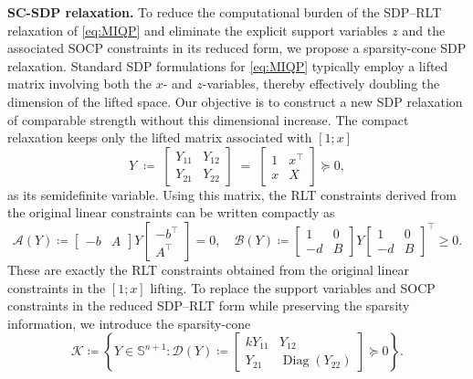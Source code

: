 \documentclass[11pt]{article}
\DeclareMathOperator{\Diag}{Diag}
\def\D{\mathcal{D}}
\def\A{\mathcal{A}}
\def\B{\mathcal{B}}
\def\K{\mathcal{K}}
\def\S{\mathbb{S}}
\def\tb#1{\textbf{#1}}
\theoremstyle{plain}
\begin{document}
\medskip

\noindent\tb{SC-SDP relaxation.} 
{To reduce the computational burden of the SDP--RLT relaxation of \eqref{eq:MIQP} and eliminate the explicit support variables $z$ and the associated SOCP constraints in its reduced form,} we propose a sparsity-cone SDP relaxation. Standard SDP formulations for \eqref{eq:MIQP} typically employ a lifted matrix involving both the $x$- and $z$-variables, thereby effectively doubling the dimension of the lifted space. Our objective is to construct a new SDP relaxation of comparable strength without this dimensional increase. The compact relaxation keeps only the lifted matrix associated with $[1;x]$
\begin{equation}\label{eq:intro-Y}
    Y
\;\coloneq\; 
\begin{bmatrix}
    Y_{11} &Y_{12}\\Y_{21} & Y_{22}
\end{bmatrix}
\;=\;
\begin{bmatrix}
    1&x^\top \\
    x&X
\end{bmatrix}\succeq 0,
\end{equation}
as its semidefinite variable. Using this matrix, the RLT constraints derived from the original linear constraints can be written compactly as
\begin{equation}\label{eq:intro-RLT}
    \A(Y)\coloneqq\begin{bmatrix}
    -b&A
    \end{bmatrix}
    Y\begin{bmatrix}
        -b^\top\\A^\top
    \end{bmatrix}=0,\quad
    \B(Y)\coloneqq  \begin{bmatrix}
     1&0
        \\-d&B
    \end{bmatrix}
    Y\begin{bmatrix}
        1&0
        \\-d&B
    \end{bmatrix}^\top\geq 0.
\end{equation}
These are exactly the RLT constraints obtained from the original linear constraints in the $[1;x]$ lifting. {To replace the support variables and SOCP constraints in the reduced SDP--RLT form while preserving the sparsity information}, we introduce the sparsity-cone
\begin{equation}\label{eq:intro-K-set}
    \K\coloneq \left\{Y\in\S^{n+1}: \D(Y)\coloneq \begin{bmatrix}
    k Y_{11}&Y_{12}\\Y_{21} & \Diag(Y_{22})
\end{bmatrix}\succeq 0\right\}.
\end{equation}
\end{document}
